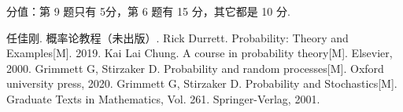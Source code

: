 \begin{remark}
分值：第 9 题只有 5分，第 6 题有 15 分，其它都是 10 分.
\end{remark}









\begin{thebibliography}{99}
     任佳刚. 概率论教程（未出版）.
     Rick Durrett. Probability: Theory and Examples[M]. 2019.
     Kai Lai Chung. A course in probability theory[M]. Elsevier, 2000.
     Grimmett G, Stirzaker D. Probability and random processes[M]. Oxford university press, 2020.
     Grimmett G, Stirzaker D. Probability and Stochastics[M]. Graduate Texts in Mathematics, Vol. 261. Springer-Verlag, 2001.
\end{thebibliography}

